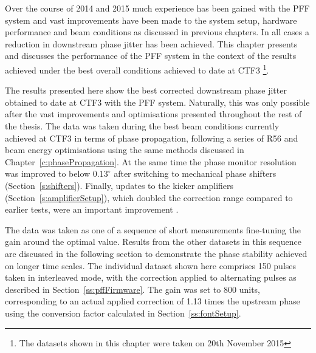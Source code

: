 
Over the course of 2014 and 2015 much experience has been gained with the PFF system and vast improvements have been made to the system setup, hardware performance and beam conditions as discussed in previous chapters. In all cases a reduction in downstream phase jitter has been achieved. This chapter presents and discusses the performance of the PFF system in the context of the results achieved under the best overall conditions achieved to date at CTF3 \footnote{The datasets shown in this chapter were taken on 20th November 2015}.




The results presented here show the best corrected downstream phase jitter obtained to date at CTF3 with the PFF system. Naturally, this was only possible after the vast improvements and optimisations presented throughout the rest of the thesis. The data was taken during the best beam conditions currently achieved at CTF3 in terms of phase propagation, following a series of R56 and beam energy optimisations using the same methods discussed in Chapter~\ref{c:phasePropagation}. %
At the same time the phase monitor resolution was improved to below \(0.13^\circ\) after switching to mechanical phase shifters (Section~\ref{s:shifters}). Finally, updates to the kicker amplifiers (Section~\ref{s:amplifierSetup}), which doubled the correction range compared to earlier tests, were an important improvement .

The data was taken as one of a sequence of short measurements fine-tuning the gain around the optimal value. Results from the other datasets in this sequence are discussed in the following section to demonstrate the phase stability achieved on longer time scales. The individual dataset shown here comprises 150 pulses taken in interleaved mode, with the correction applied to alternating pulses as described in Section~\ref{ss:pffFirmware}. The gain was set to 800 units, corresponding to an actual applied correction of 1.13 times the upstream phase using the conversion factor calculated in Section~\ref{ss:fontSetup}.

